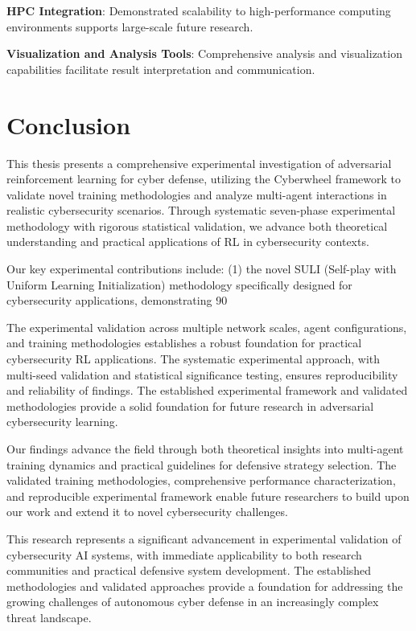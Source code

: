 \documentclass[11pt]{article}
\newcounter{phase}[algorithm]
\theoremstyle{definition}
\theoremstyle{plain}
\begin{document}
\textbf{HPC Integration}: Demonstrated scalability to high-performance computing environments supports large-scale future research.

\textbf{Visualization and Analysis Tools}: Comprehensive analysis and visualization capabilities facilitate result interpretation and communication.

\section{Conclusion}

This thesis presents a comprehensive experimental investigation of adversarial reinforcement learning for cyber defense, utilizing the Cyberwheel framework to validate novel training methodologies and analyze multi-agent interactions in realistic cybersecurity scenarios. Through systematic seven-phase experimental methodology with rigorous statistical validation, we advance both theoretical understanding and practical applications of RL in cybersecurity contexts.

Our key experimental contributions include: (1) the novel SULI (Self-play with Uniform Learning Initialization) methodology specifically designed for cybersecurity applications, demonstrating 90%

The experimental validation across multiple network scales, agent configurations, and training methodologies establishes a robust foundation for practical cybersecurity RL applications. The systematic experimental approach, with multi-seed validation and statistical significance testing, ensures reproducibility and reliability of findings. The established experimental framework and validated methodologies provide a solid foundation for future research in adversarial cybersecurity learning.

Our findings advance the field through both theoretical insights into multi-agent training dynamics and practical guidelines for defensive strategy selection. The validated training methodologies, comprehensive performance characterization, and reproducible experimental framework enable future researchers to build upon our work and extend it to novel cybersecurity challenges.

This research represents a significant advancement in experimental validation of cybersecurity AI systems, with immediate applicability to both research communities and practical defensive system development. The established methodologies and validated approaches provide a foundation for addressing the growing challenges of autonomous cyber defense in an increasingly complex threat landscape.



\end{document}
